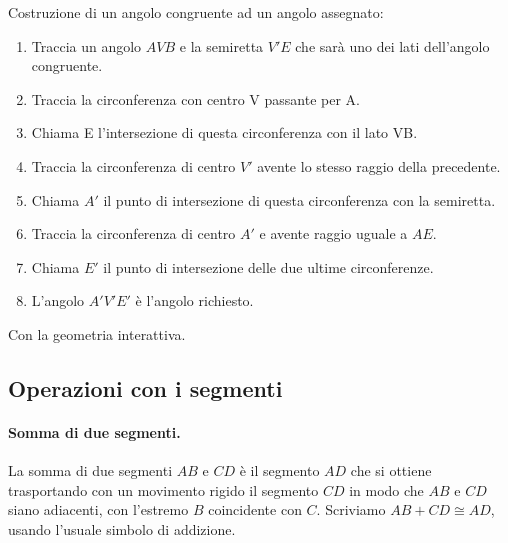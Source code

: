 \begin{procedura}\label{proc:fonda_trasp_ang}
 Costruzione di un angolo congruente ad un angolo assegnato:
\begin{enumerate} [nosep]
\item 
Traccia un angolo \(AVB\) e la semiretta  \(V'E\) che sarà uno dei lati 
dell'angolo congruente.
\item 
Traccia la circonferenza con centro V passante per A.
\item
Chiama E l'intersezione di questa circonferenza con il lato VB.
\item 
Traccia la circonferenza di centro \(V'\)  avente lo stesso raggio della 
precedente.
\item
Chiama \(A'\) il punto di intersezione di questa circonferenza con la 
semiretta. 
\item 
Traccia la circonferenza di centro \(A'\) e  avente raggio uguale a \(AE\).
\item 
Chiama \(E'\) il punto di intersezione delle due ultime circonferenze.
\item 
L'angolo \(A'V'E'\) è l'angolo richiesto.
\end{enumerate}
\end{procedura}

\ifcoding
Con la geometria interattiva.


\fi

\subsection{Operazioni con i segmenti}

\paragraph{Somma di due segmenti.} La somma di due segmenti \(AB\) e 
\(CD\) è il segmento \(AD\) che si ottiene trasportando con un movimento 
rigido il segmento \(CD\) in modo che \(AB\) e \(CD\) siano adiacenti, con 
l'estremo \(B\) coincidente con \(C\). Scriviamo \(AB + CD \cong AD\), 
usando l'usuale simbolo di addizione.


\begin{inaccessibleblock}
\begin{center}\end{center}
\end{inaccessibleblock}

